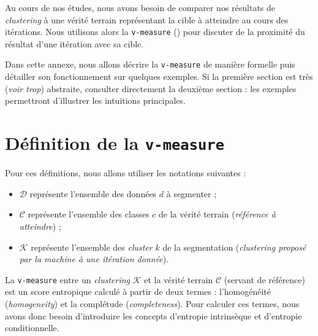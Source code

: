 \DontFrameThisInToc
{}
\label{annex:D-ANNEXE-EVALUATION-CLUSTERING}

	Au cours de nos études, nous avons besoin de comparer nos résultats de \textit{clustering} à une vérité terrain représentant la cible à atteindre au cours des itérations.
	Nous utilisons alors la \texttt{v-measure} (\cite{rosenberg-hirschberg:2007:vmeasure-conditional-entropybased}) pour discuter de la proximité du résultat d'une itération avec sa cible.
	
	\begin{leftBarAuthorOpinion}
		Dans cette annexe, nous allons décrire la \texttt{v-measure} de manière formelle puis détailler son fonctionnement sur quelques exemples.
		Si la première section est très (\textit{voir trop}) abstraite, consulter directement la deuxième section : les exemples permettront d'illustrer les intuitions principales.
	\end{leftBarAuthorOpinion}
	
	\minitoc

	\newpage
	\section{Définition de la \texttt{v-measure}}
	\label{annex:D.1-ANNEXE-EVALUATION-CLUSTERING-DEFINITION}
		
		Pour ces définitions, nous allons utiliser les notations suivantes :
		\begin{itemize}
			\item $\mathcal{D}$ représente l'ensemble des données $d$ à segmenter ;
			\item $\mathcal{C}$ représente l'ensemble des classes $c$ de la vérité terrain (\textit{référence à atteindre}) ;
			\item $\mathcal{K}$ représente l'ensemble des \textit{cluster} $k$ de la segmentation (\textit{clustering proposé par la machine à une itération donnée}).
		\end{itemize}
		
		
		La \texttt{v-measure} entre un \textit{clustering} $\mathcal{K}$ et la vérité terrain $\mathcal{C}$ (servant de référence) est un score entropique calculé à partir de deux termes : l'homogénéité (\textit{homogeneity}) et la complétude (\textit{completeness}).
		Pour calculer ces termes, nous avons donc besoin d'introduire les concepts d'entropie intrinsèque et d'entropie conditionnelle.
		\newline
		
